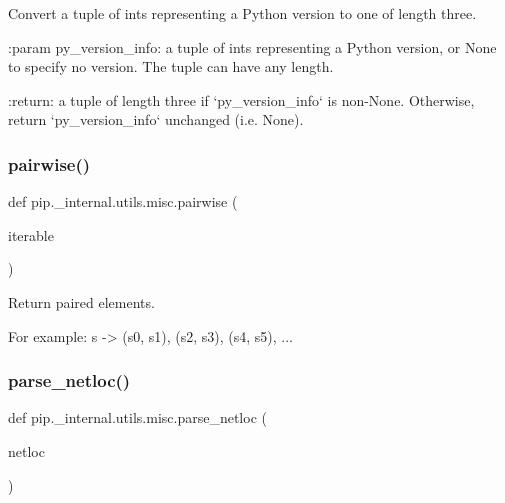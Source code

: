 \begin{DoxyVerb}Convert a tuple of ints representing a Python version to one of length
three.

:param py_version_info: a tuple of ints representing a Python version,
    or None to specify no version. The tuple can have any length.

:return: a tuple of length three if `py_version_info` is non-None.
    Otherwise, return `py_version_info` unchanged (i.e. None).
\end{DoxyVerb}
 \mbox{\label{namespacepip_1_1__internal_1_1utils_1_1misc_adc48e1cb3474fff341e006d66f83afbb}} 
\subsubsection{\texorpdfstring{pairwise()}{pairwise()}}
{\footnotesize\ttfamily def pip.\+\_\+internal.\+utils.\+misc.\+pairwise (\begin{DoxyParamCaption}\item[{}]{iterable }\end{DoxyParamCaption})}

\begin{DoxyVerb}Return paired elements.

For example:
    s -> (s0, s1), (s2, s3), (s4, s5), ...
\end{DoxyVerb}
 \mbox{\label{namespacepip_1_1__internal_1_1utils_1_1misc_ad6a468c642f6c3faa6cc8464cd9ae654}} 
\subsubsection{\texorpdfstring{parse\+\_\+netloc()}{parse\_netloc()}}
{\footnotesize\ttfamily def pip.\+\_\+internal.\+utils.\+misc.\+parse\+\_\+netloc (\begin{DoxyParamCaption}\item[{}]{netloc }\end{DoxyParamCaption})}

